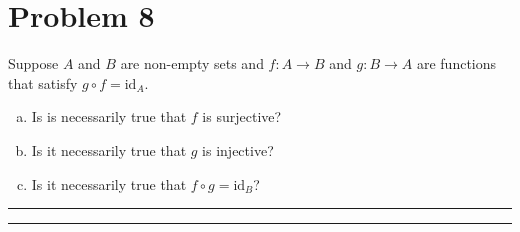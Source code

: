 \documentclass{article}
\theoremstyle{definition}
\newenvironment{solution}{\bigskip\hrule{\hfill}}{\bigskip\hrule{\hfill}} %
\begin{document}
\section*{Problem 8}
Suppose $A$ and $B$ are non-empty sets and $f:A\longrightarrow B$ and $g:B\longrightarrow A$ are functions that satisfy $g\circ f=\text{id}_A$.
\begin{enumerate}[a)] %
    \item Is is necessarily true that $f$ is surjective?
    \item Is it necessarily true that $g$ is injective?
    \item Is it necessarily true that $f\circ g=\text{id}_B$?
\end{enumerate}
\begin{solution}


\end{solution}

\end{document}
